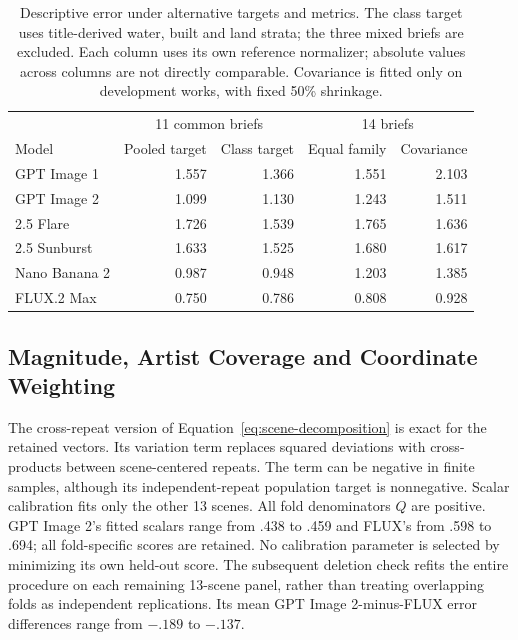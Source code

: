 \begin{table}[htbp]
\caption{Descriptive error under alternative targets and metrics. The class target uses title-derived water, built and land strata; the three mixed briefs are excluded. Each column uses its own reference normalizer; absolute values across columns are not directly comparable. Covariance is fitted only on development works, with fixed 50\% shrinkage.}
\label{tab:review-targets}
\centering\small
\begin{tabular}{@{}lrrrr@{}}\toprule
 & \multicolumn{2}{c}{11 common briefs} & \multicolumn{2}{c}{14 briefs}\\
Model & Pooled target & Class target & Equal family & Covariance\\\midrule
GPT Image 1 & 1.557 & 1.366 & 1.551 & 2.103\\
GPT Image 2 & 1.099 & 1.130 & 1.243 & 1.511\\
2.5 Flare & 1.726 & 1.539 & 1.765 & 1.636\\
2.5 Sunburst & 1.633 & 1.525 & 1.680 & 1.617\\
Nano Banana 2 & 0.987 & 0.948 & 1.203 & 1.385\\
FLUX.2 Max & 0.750 & 0.786 & 0.808 & 0.928\\
\bottomrule\end{tabular}

\end{table}

\FloatBarrier

\subsection{Magnitude, Artist Coverage and Coordinate Weighting}\label{app:magnitude-coverage}
The cross-repeat version of Equation~\ref{eq:scene-decomposition} is exact for
the retained vectors. Its variation term replaces squared deviations with
cross-products between scene-centered repeats. The term can be negative in
finite samples, although its independent-repeat population target is nonnegative.
Scalar calibration fits only the other 13 scenes. All fold denominators $Q$
are positive. GPT Image 2's fitted scalars range from .438 to .459 and FLUX's
from .598 to .694; all fold-specific scores are retained. No calibration
parameter is selected by minimizing its own held-out score. The subsequent
deletion check refits the entire procedure on
each remaining 13-scene panel, rather than treating overlapping folds as
independent replications. Its mean GPT Image 2-minus-FLUX error differences
range from $-.189$ to $-.137$.

